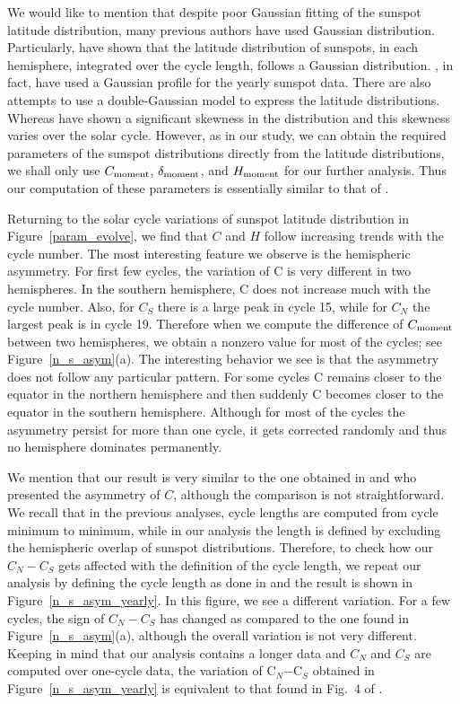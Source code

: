 \documentclass[preprint2,times,tighten]{aastex61}
\newcommand{\Fig}[1]{Figure~\ref{#1}}
\begin{document}
We would like to mention that despite poor Gaussian fitting of the sunspot latitude distribution,
many previous authors have used Gaussian distribution.
Particularly, \citet{2017A&A...601A.106M} have shown that the latitude distribution of sunspots, in each hemisphere, 
integrated over the cycle length, follows a Gaussian distribution. 
\cite{CS16}, in fact, have used a Gaussian profile for the yearly sunspot data.
There are also attempts to use a double-Gaussian model to express the latitude distributions\citep{2012NewA...17..247C}. 
Whereas \citet{2013Ge&Ae..53..962M} have shown a significant skewness in the distribution 
and this skewness varies over the solar cycle.
However, as in our study, we can obtain the required parameters of the sunspot distributions directly from the latitude distributions,
we shall only use $C_{\rm{ moment}}$, $\delta_{\rm{ moment}}$, and $H_{\rm{ moment}}$ for our further analysis. 
Thus our computation of these parameters is essentially similar to that of \citet{2008A&A...483..623S}.

Returning to the solar cycle variations of sunspot latitude distribution 
in \Fig{param_evolve}, we find that $C$ and $H$ follow increasing trends with the cycle number. 
The most interesting feature we observe is the hemispheric asymmetry. 
For first few cycles, the variation of C is very different in two hemispheres.
In the southern hemisphere, C does not increase much with the cycle number. 
Also, for $C_S$ there is a large peak in cycle 15, while for $C_N$ the largest peak is in cycle 19. 
Therefore when we compute the difference of $C_{\rm{moment}}$ between two hemispheres, 
we obtain a nonzero value for most of the cycles; see \Fig{n_s_asym}(a). 
The interesting behavior we see is that the asymmetry does not follow any particular pattern. 
For some cycles C remains closer to the equator in the northern hemisphere and then suddenly 
C becomes closer to the equator in the southern hemisphere.
Although for most of the cycles the asymmetry persist for more than one cycle, it gets corrected randomly and thus no hemisphere dominates permanently.

We mention that our result is very similar to the one obtained in \citet{1999A&A...341L..43P} 
and \citet{2010AN....331..765Z} who presented the asymmetry of $C$, although the comparison is 
not straightforward. We recall that in the previous analyses, cycle lengths are computed from 
cycle minimum to minimum, while in our analysis the length is defined by excluding the hemispheric 
overlap of sunspot distributions. Therefore, to check how our $C_N-C_S$ gets affected with 
the definition of the cycle length, we repeat our analysis by defining the cycle length as 
done in \citet{1999A&A...341L..43P} and the result is shown in \Fig{n_s_asym_yearly}.
In this figure, we see a different variation. For a few cycles, the sign of $C_N-C_S$ has 
changed as compared to the one found in \Fig{n_s_asym}(a), although the overall variation is not 
very different. Keeping in mind that our analysis contains a longer data and $C_N$ and $C_S$ are 
computed over one-cycle data, the variation of C$_N$$-$C$_S$ obtained in \Fig{n_s_asym_yearly} is 
equivalent to that found in Fig.\ 4 of \citet{1999A&A...341L..43P}.
\end{document}
